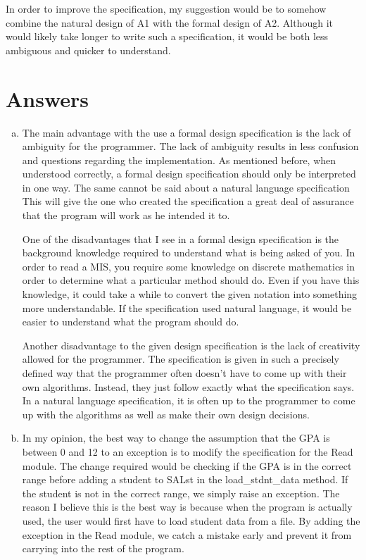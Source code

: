 \documentclass[12pt]{article}
\begin{document}
  In order to improve the specification, my suggestion would be to somehow combine the natural design of A1 with the formal
  design of A2.
  Although it would likely take longer to write such a specification, it would be both less ambiguous and quicker to
  understand.

\section{Answers}


\begin{enumerate}[a)]

  \item
  The main advantage with the use a formal design specification is the lack of ambiguity for the programmer.
  The lack of ambiguity results in less confusion and questions regarding the implementation.
  As mentioned before, when understood correctly, a formal design specification should only be interpreted in one way.
  The same cannot be said about a natural language specification
  This will give the one who created the specification a great deal of assurance that the program will work as
  he intended it to.

  One of the disadvantages that I see in a formal design specification is the background knowledge required to
  understand what is being asked of you.
  In order to read a MIS, you require some knowledge on discrete mathematics in order to determine what a particular
  method should do.
  Even if you have this knowledge, it could take a while to convert the given notation into something more
  understandable.
  If the specification used natural language, it would be easier to understand what the program should do.

  Another disadvantage to the given design specification is the lack of creativity allowed for the programmer.
  The specification is given in such a precisely defined way that the programmer often doesn't have to
  come up with their own algorithms.
  Instead, they just follow exactly what the specification says.
  In a natural language specification, it is often up to the programmer to come up with the algorithms as well as
  make their own design decisions.

  \item In my opinion, the best way to change the assumption that the GPA is between 0 and 12 to an exception is to
  modify the specification for the Read module.
  The change required would be checking if the GPA is in the correct range before adding a student to SALst in the
  load\_stdnt\_data method.
  If the student is not in the correct range, we simply raise an exception.
  The reason I believe this is the best way is because when the program is actually used, the user would first have to
  load student data from a file.
  By adding the exception in the Read module, we catch a mistake early and prevent it from carrying into the rest of the
  program.


\end{enumerate}
\end{document}
